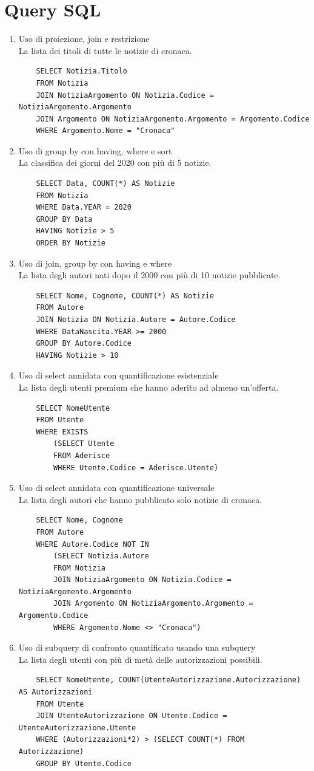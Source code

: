 \documentclass[10pt]{article}
\begin{document}
\section{Query SQL}
\begin{enumerate}
	\item Uso di proiezione, join e restrizione\\
	La lista dei titoli di tutte le notizie di cronaca.
	\begin{lstlisting}
	SELECT Notizia.Titolo
	FROM Notizia
	JOIN NotiziaArgomento ON Notizia.Codice = NotiziaArgomento.Argomento
	JOIN Argomento ON NotiziaArgomento.Argomento = Argomento.Codice
	WHERE Argomento.Nome = "Cronaca"
	\end{lstlisting}
	\item Uso di group by con having, where e sort\\
	La classifica dei giorni del 2020 con più di 5 notizie.
	\begin{lstlisting}
	SELECT Data, COUNT(*) AS Notizie
	FROM Notizia
	WHERE Data.YEAR = 2020
	GROUP BY Data
	HAVING Notizie > 5
	ORDER BY Notizie
	\end{lstlisting}
	\item Uso di join, group by con having e where\\
	La lista degli autori nati dopo il 2000 con più di 10 notizie pubblicate.
	\begin{lstlisting}
	SELECT Nome, Cognome, COUNT(*) AS Notizie
	FROM Autore
	JOIN Notizia ON Notizia.Autore = Autore.Codice
	WHERE DataNascita.YEAR >= 2000
	GROUP BY Autore.Codice
	HAVING Notizie > 10
	\end{lstlisting}
	\item Uso di select annidata con quantificazione esistenziale\\
	La lista degli utenti premium che hanno aderito ad almeno un'offerta.
	\begin{lstlisting}
	SELECT NomeUtente
	FROM Utente
	WHERE EXISTS
		(SELECT Utente
		FROM Aderisce
		WHERE Utente.Codice = Aderisce.Utente)
	\end{lstlisting}
	\item Uso di select annidata con quantificazione universale\\
	La lista degli autori che hanno pubblicato solo notizie di cronaca.
	\begin{lstlisting}
	SELECT Nome, Cognome
	FROM Autore
	WHERE Autore.Codice NOT IN
		(SELECT Notizia.Autore
		FROM Notizia
		JOIN NotiziaArgomento ON Notizia.Codice = NotiziaArgomento.Argomento
		JOIN Argomento ON NotiziaArgomento.Argomento = Argomento.Codice
		WHERE Argomento.Nome <> "Cronaca")
	\end{lstlisting}
	\item Uso di subquery di confronto quantificato usando una subquery\\
	La lista degli utenti con più di metà delle autorizzazioni possibili.
	\begin{lstlisting}
	SELECT NomeUtente, COUNT(UtenteAutorizzazione.Autorizzazione) AS Autorizzazioni
	FROM Utente
	JOIN UtenteAutorizzazione ON Utente.Codice = UtenteAutorizzazione.Utente
	WHERE (Autorizzazioni*2) > (SELECT COUNT(*) FROM Autorizzazione)
	GROUP BY Utente.Codice
	\end{lstlisting}
\end{enumerate}
\end{document}
